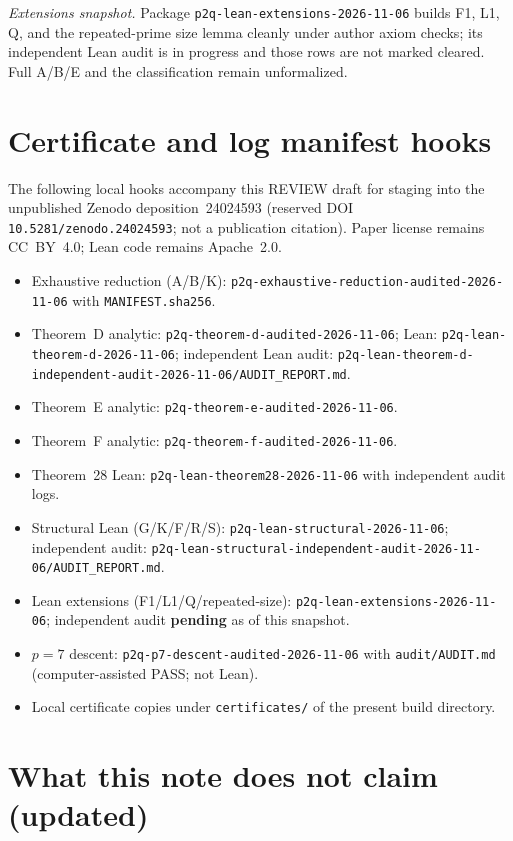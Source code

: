 \documentclass[11pt,reqno]{amsart}
\theoremstyle{definition}
\begin{document}
\noindent\textit{Extensions snapshot.} Package \texttt{p2q-lean-extensions-2026-11-06} builds F1, L1, Q, and the repeated-prime size lemma cleanly under author axiom checks; its independent Lean audit is in progress and those rows are not marked cleared. Full A/B/E and the classification remain unformalized.

\section{Certificate and log manifest hooks}
\label{sec:manifest}

The following local hooks accompany this REVIEW draft for staging into the unpublished Zenodo deposition~24024593 (reserved DOI \texttt{10.5281/zenodo.24024593}; not a publication citation). Paper license remains CC~BY~4.0; Lean code remains Apache~2.0.

\begin{itemize}
\item Exhaustive reduction (A/B/K): \texttt{p2q-exhaustive-reduction-audited-2026-11-06} with \texttt{MANIFEST.sha256}.
\item Theorem~D analytic: \texttt{p2q-theorem-d-audited-2026-11-06}; Lean: \texttt{p2q-lean-theorem-d-2026-11-06}; independent Lean audit: \texttt{p2q-lean-theorem-d-independent-audit-2026-11-06/AUDIT\_REPORT.md}.
\item Theorem~E analytic: \texttt{p2q-theorem-e-audited-2026-11-06}.
\item Theorem~F analytic: \texttt{p2q-theorem-f-audited-2026-11-06}.
\item Theorem~28 Lean: \texttt{p2q-lean-theorem28-2026-11-06} with independent audit logs.
\item Structural Lean (G/K/F/R/S): \texttt{p2q-lean-structural-2026-11-06}; independent audit: \texttt{p2q-lean-structural-independent-audit-2026-11-06/AUDIT\_REPORT.md}.
\item Lean extensions (F1/L1/Q/repeated-size): \texttt{p2q-lean-extensions-2026-11-06}; independent audit \textbf{pending} as of this snapshot.
\item \(p=7\) descent: \texttt{p2q-p7-descent-audited-2026-11-06} with \texttt{audit/AUDIT.md} (computer-assisted PASS; not Lean).
\item Local certificate copies under \texttt{certificates/} of the present build directory.
\end{itemize}

\section*{What this note does not claim (updated)}
\label{sec:noclaim-v011}
\end{document}
